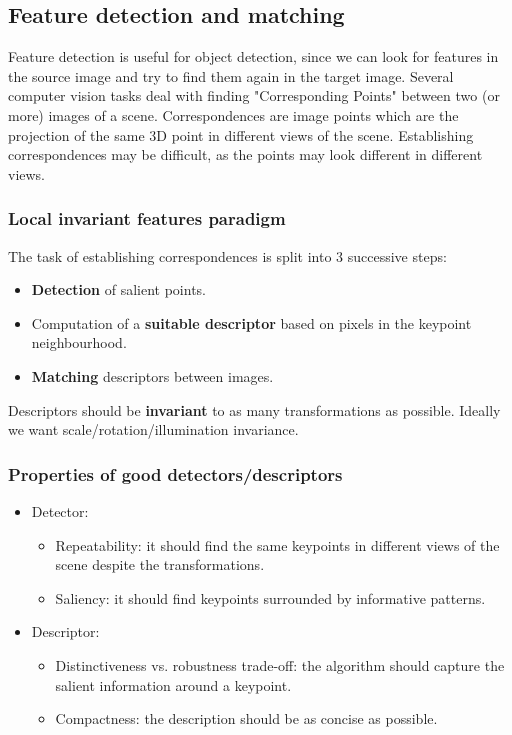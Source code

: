 \documentclass{article}
\begin{document}
\subsection{Feature detection and matching}
Feature detection is useful for object detection, since we can look for features in the source image and try to find them again in the target image.
Several computer vision tasks deal with finding "Corresponding Points" between two (or more) images of a scene.
Correspondences are image points which are the projection of the same 3D point in different views of the scene.
Establishing correspondences may be difficult, as the points may look different in different views.

\subsubsection{Local invariant features paradigm}
The task of establishing correspondences is split into 3 successive steps:
\begin{itemize}
  \item \textbf{Detection} of salient points.
  \item Computation of a \textbf{suitable descriptor} based on pixels in the keypoint neighbourhood.
  \item \textbf{Matching} descriptors between images.
\end{itemize}

Descriptors should be \textbf{invariant} to as many transformations as possible.
Ideally we want scale/rotation/illumination invariance.

\subsubsection{Properties of good detectors/descriptors}
\begin{itemize}
  \item Detector:
  \begin{itemize}
    \item Repeatability: it should find the same keypoints in different views of the scene despite the transformations.
    \item Saliency: it should find keypoints surrounded by informative patterns.
  \end{itemize}
  \item Descriptor:
  \begin{itemize}
    \item Distinctiveness vs. robustness trade-off: the algorithm should capture the salient information around a keypoint.
    \item Compactness: the description should be as concise as possible.
  \end{itemize}
\end{itemize}
\end{document}

